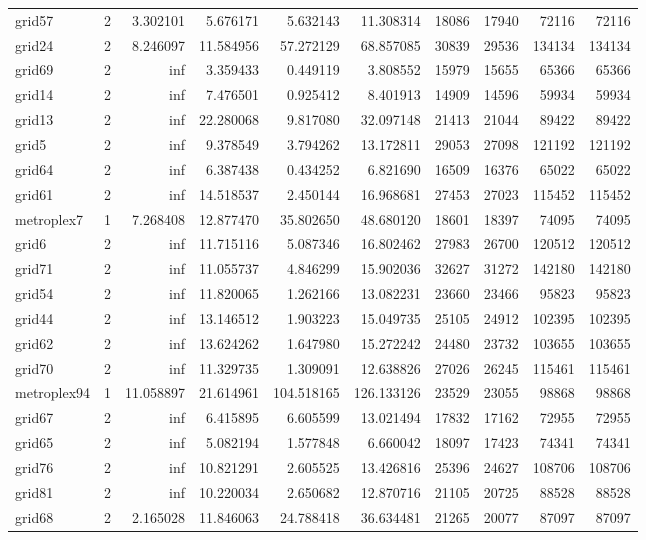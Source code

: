 \begin{longtable}{|l|r|r|r|r|r|r|r|r|r|}
grid57 & 2 & 3.302101 & 5.676171 & 5.632143 & 11.308314 & 18086 & 17940 & 72116 & 72116 \\
grid24 & 2 & 8.246097 & 11.584956 & 57.272129 & 68.857085 & 30839 & 29536 & 134134 & 134134 \\
grid69 & 2 & inf & 3.359433 & 0.449119 & 3.808552 & 15979 & 15655 & 65366 & 65366 \\
grid14 & 2 & inf & 7.476501 & 0.925412 & 8.401913 & 14909 & 14596 & 59934 & 59934 \\
grid13 & 2 & inf & 22.280068 & 9.817080 & 32.097148 & 21413 & 21044 & 89422 & 89422 \\
grid5 & 2 & inf & 9.378549 & 3.794262 & 13.172811 & 29053 & 27098 & 121192 & 121192 \\
grid64 & 2 & inf & 6.387438 & 0.434252 & 6.821690 & 16509 & 16376 & 65022 & 65022 \\
grid61 & 2 & inf & 14.518537 & 2.450144 & 16.968681 & 27453 & 27023 & 115452 & 115452 \\
metroplex7 & 1 & 7.268408 & 12.877470 & 35.802650 & 48.680120 & 18601 & 18397 & 74095 & 74095 \\
grid6 & 2 & inf & 11.715116 & 5.087346 & 16.802462 & 27983 & 26700 & 120512 & 120512 \\
grid71 & 2 & inf & 11.055737 & 4.846299 & 15.902036 & 32627 & 31272 & 142180 & 142180 \\
grid54 & 2 & inf & 11.820065 & 1.262166 & 13.082231 & 23660 & 23466 & 95823 & 95823 \\
grid44 & 2 & inf & 13.146512 & 1.903223 & 15.049735 & 25105 & 24912 & 102395 & 102395 \\
grid62 & 2 & inf & 13.624262 & 1.647980 & 15.272242 & 24480 & 23732 & 103655 & 103655 \\
grid70 & 2 & inf & 11.329735 & 1.309091 & 12.638826 & 27026 & 26245 & 115461 & 115461 \\
metroplex94 & 1 & 11.058897 & 21.614961 & 104.518165 & 126.133126 & 23529 & 23055 & 98868 & 98868 \\
grid67 & 2 & inf & 6.415895 & 6.605599 & 13.021494 & 17832 & 17162 & 72955 & 72955 \\
grid65 & 2 & inf & 5.082194 & 1.577848 & 6.660042 & 18097 & 17423 & 74341 & 74341 \\
grid76 & 2 & inf & 10.821291 & 2.605525 & 13.426816 & 25396 & 24627 & 108706 & 108706 \\
grid81 & 2 & inf & 10.220034 & 2.650682 & 12.870716 & 21105 & 20725 & 88528 & 88528 \\
grid68 & 2 & 2.165028 & 11.846063 & 24.788418 & 36.634481 & 21265 & 20077 & 87097 & 87097 \\

\end{longtable}
